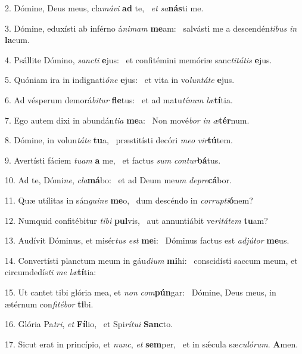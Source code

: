 2. Dómine, Deus meus, cla\textit{má}\textit{vi} \textbf{ad} te, \ast\  \textit{et} \textit{sa}\textbf{nás}ti me.\

3. Dómine, eduxísti ab inférno á\textit{ni}\textit{mam} \textbf{me}am: \ast\  salvásti me a descendén\textit{ti}\textit{bus} \textit{in} \textbf{la}cum.\

4. Psállite Dómino, \textit{sanc}\textit{ti} \textbf{e}jus: \ast\  et confitémini memóriæ sanc\textit{ti}\textit{tá}\textit{tis} \textbf{e}jus.\

5. Quóniam ira in indignati\textit{ó}\textit{ne} \textbf{e}jus: \ast\  et vita in vo\textit{lun}\textit{tá}\textit{te} \textbf{e}jus.\

6. Ad vésperum demorá\textit{bi}\textit{tur} \textbf{fle}tus: \ast\  et ad matu\textit{tí}\textit{num} \textit{læ}\textbf{tí}tia.\

7. Ego autem dixi in abundán\textit{ti}\textit{a} \textbf{me}a: \ast\  Non mové\textit{bor} \textit{in} \textit{æ}\textbf{tér}num.\

8. Dómine, in volun\textit{tá}\textit{te} \textbf{tu}a, \ast\  præstitísti decóri \textit{me}\textit{o} \textit{vir}\textbf{tú}tem.\

9. Avertísti fáciem \textit{tu}\textit{am} \textbf{a} me, \ast\  et factus \textit{sum} \textit{con}\textit{tur}\textbf{bá}tus.\

10. Ad te, Dómi\textit{ne}, \textit{cla}\textbf{má}bo: \ast\  et ad Deum me\textit{um} \textit{de}\textit{pre}\textbf{cá}bor.\

11. Quæ utílitas in sán\textit{gui}\textit{ne} \textbf{me}o, \ast\  dum descéndo in \textit{cor}\textit{rup}\textit{ti}\textbf{ó}nem?\

12. Numquid confitébitur \textit{ti}\textit{bi} \textbf{pul}vis, \ast\  aut annuntiábit ve\textit{ri}\textit{tá}\textit{tem} \textbf{tu}am?\

13. Audívit Dóminus, et misér\textit{tus} \textit{est} \textbf{me}i: \ast\  Dóminus factus est \textit{ad}\textit{jú}\textit{tor} \textbf{me}us.\

14. Convertísti planctum meum in gáu\textit{di}\textit{um} \textbf{mi}hi: \ast\  conscidísti saccum meum, et circumdedís\textit{ti} \textit{me} \textit{læ}\textbf{tí}tia:\

15. Ut cantet tibi glória mea, et \textit{non} \textit{com}\textbf{pún}gar: \ast\  Dómine, Deus meus, in ætérnum con\textit{fi}\textit{té}\textit{bor} \textbf{ti}bi.\

16. Glória Pa\textit{tri}, \textit{et} \textbf{Fí}lio, \ast\  et Spi\textit{rí}\textit{tu}\textit{i} \textbf{Sanc}to.\

17. Sicut erat in princípio, et \textit{nunc}, \textit{et} \textbf{sem}per, \ast\  et in sǽcula sæ\textit{cu}\textit{ló}\textit{rum}. \textbf{A}men.\

